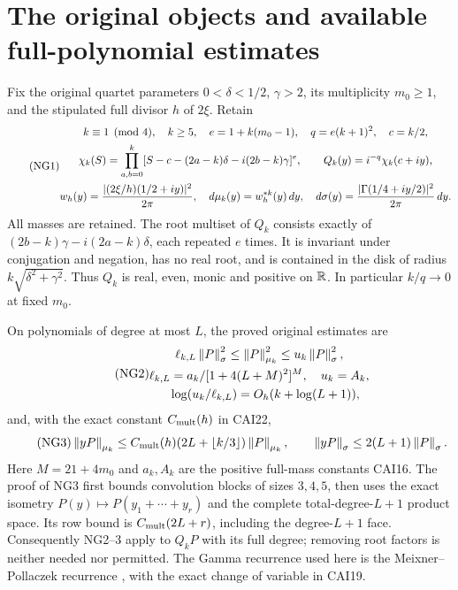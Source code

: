 \documentclass[11pt]{article}
\begin{document}
\section{The original objects and available full-polynomial estimates}
Fix the original quartet parameters $0<\delta<1/2$, $\gamma>2$, its
multiplicity $m_0\ge1$, and the stipulated full divisor $h$ of $2\xi$.
Retain
\begin{equation}\tag{NG1}
 \begin{gathered}
 k\equiv1\pmod4,\quad k\ge5,\quad e=1+k(m_0-1),\quad q=e(k+1)^2,\quad c=k/2,\\
 \chi_k(S)=\prod_{a,b=0}^k
 [S-c-(2a-k)\delta-i(2b-k)\gamma]^e,\qquad
 Q_k(y)=i^{-q}\chi_k(c+iy),\\
 w_h(y)=\frac{|(2\xi/h)(1/2+iy)|^2}{2\pi},\quad
 d\mu_k(y)=w_h^{*k}(y)\,d y,\quad
 d\sigma(y)=\frac{|\Gamma(1/4+iy/2)|^2}{2\pi}\,d y.
 \end{gathered}
\end{equation}
All masses are retained. The root multiset of $Q_k$ consists exactly of
$(2b-k)\gamma-i(2a-k)\delta$, each repeated $e$ times. It is invariant
under conjugation and negation, has no real root, and is contained in the
disk of radius $k\sqrt{\delta^2+\gamma^2}$. Thus $Q_k$ is real, even,
monic and positive on $\mathbb R$. In particular $k/q\to0$ at fixed $m_0$.

On polynomials of degree at most $L$, the proved original estimates are
\begin{equation}\tag{NG2}
 \begin{gathered}
 \ell_{k,L}\left\lVert P\right\rVert_\sigma^2\le\left\lVert P\right\rVert_{\mu_k}^2
 \le u_k\left\lVert P\right\rVert_\sigma^2,\\
 \ell_{k,L}=a_k/[1+4(L+M)^2]^M,
 \quad u_k=A_k,\\
 \quad \log(u_k/\ell_{k,L})=O_h(k+\log(L+1)),
 \end{gathered}
\end{equation}
and, with the exact constant $C_{\rm mult}(h)$ in CAI22,
\begin{equation}\tag{NG3}
 \left\lVert yP\right\rVert_{\mu_k}\le C_{\rm mult}(h)(2L+\lfloor k/3\rfloor)
                    \left\lVert P\right\rVert_{\mu_k},\qquad
 \left\lVert yP\right\rVert_\sigma\le2(L+1)\left\lVert P\right\rVert_\sigma.
\end{equation}
Here $M=21+4m_0$ and $a_k,A_k$ are the positive full-mass constants
CAI16. The proof of NG3 first bounds convolution blocks of sizes $3,4,5$,
then uses the exact isometry $P(y)\mapsto P(y_1+\cdots+y_r)$ and the
complete total-degree-$L+1$ product space. Its row bound is
$C_{\rm mult}(2L+r)$, including the degree-$L+1$ face. Consequently
NG2--3 apply to $Q_kP$ with its full degree; removing root factors is
neither needed nor permitted. The Gamma recurrence used here is the
Meixner--Pollaczek recurrence \cite[18.22.8,18.23.7]{osdng:dlmf}, with the exact
change of variable in CAI19.
\end{document}
